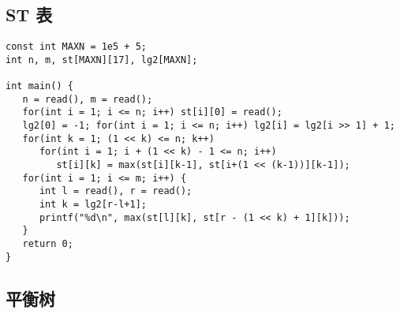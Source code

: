 \documentclass{article}
\begin{document}
   \subsection{ST 表}
\begin{lstlisting}
const int MAXN = 1e5 + 5;
int n, m, st[MAXN][17], lg2[MAXN];

int main() {
   n = read(), m = read();
   for(int i = 1; i <= n; i++) st[i][0] = read();
   lg2[0] = -1; for(int i = 1; i <= n; i++) lg2[i] = lg2[i >> 1] + 1;
   for(int k = 1; (1 << k) <= n; k++)
      for(int i = 1; i + (1 << k) - 1 <= n; i++)
         st[i][k] = max(st[i][k-1], st[i+(1 << (k-1))][k-1]);
   for(int i = 1; i <= m; i++) {
      int l = read(), r = read();
      int k = lg2[r-l+1];
      printf("%d\n", max(st[l][k], st[r - (1 << k) + 1][k]));
   }
   return 0;
}
\end{lstlisting}

   \subsection{平衡树}
   
\end{document}
